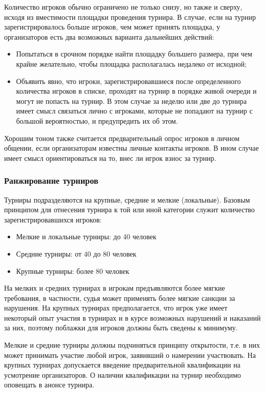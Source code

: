 Количество игроков обычно ограничено не только снизу, но также и сверху, исходя из вместимости площадки проведения турнира. В случае, если на турнир зарегистрировалось больше игроков, чем может принять площадка, у организаторов есть два возможных варианта дальнейших действий:
\begin{itemize}
	\item Попытаться в срочном порядке найти площадку большего размера, при чем крайне желательно, чтобы площадка располагалась недалеко от исходной;
	\item Объявить явно, что игроки, зарегистрировавшиеся после определенного количества игроков в списке, проходят на турнир в порядке живой очереди и могут не попасть на турнир. В этом случае за неделю или две до турнира имеет смысл связаться лично с игроками, которые не попадают на турнир с большой вероятностью, и предупредить их об этом.
\end{itemize}

Хорошим тоном также считается предварительный опрос игроков в личном общении, если организаторам известны личные контакты игроков. В ином случае имеет смысл ориентироваться на то, внес ли игрок взнос за турнир.

\subsubsection{Ранжирование турниров}

Турниры подразделяются на крупные, средние и мелкие (локальные). Базовым принципом для отнесения турнира к той или иной категории служит количество зарегистрировавшихся игроков:
\begin{itemize}
	\item Мелкие и локальные турниры: до 40 человек
	\item Средние турниры: от 40 до 80 человек
	\item Крупные турниры: более 80 человек
\end{itemize}

На мелких и средних турнирах в игрокам предъявляются более мягкие требования, в частности, судья может применять более мягкие санкции за нарушения. На крупных турнирах предполагается, что игрок уже имеет некоторый опыт участия в турнирах и в курсе возможных нарушений и наказаний за них, поэтому поблажки для игроков должны быть сведены к минимуму.

Мелкие и средние турниры должны подчиняться принципу открытости, т.е. в них может принимать участие любой игрок, заявивший о намерении участвовать. На крупных турнирах допускается введение предварительной квалификации на усмотрение организаторов. О наличии квалификации на турнир необходимо оповещать в анонсе турнира.

